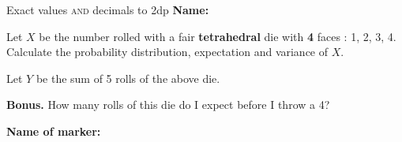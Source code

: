 \documentclass[12pt]{exam}
\begin{document}
{\small Exact values \textsc{and} decimals to 2dp} \textbf{Name:} \dotfill

\begin{questions}

\question[6]
Let $X$ be the number rolled with a fair \textbf{tetrahedral} die with \textbf{4} faces : 1, 2, 3, 4.
Calculate the probability distribution, expectation and variance of $X$.

\question
Let $Y$ be the sum of 5 rolls of the above die.


\question[0] \textbf{Bonus.}  
How many rolls of this die do I expect before I throw a 4?

\end{questions}


\begin{tcolorbox}

\textbf{Name of marker:}

\begin{center}
\gradetable[h][questions]
\end{center}

\end{tcolorbox}
\end{document}
